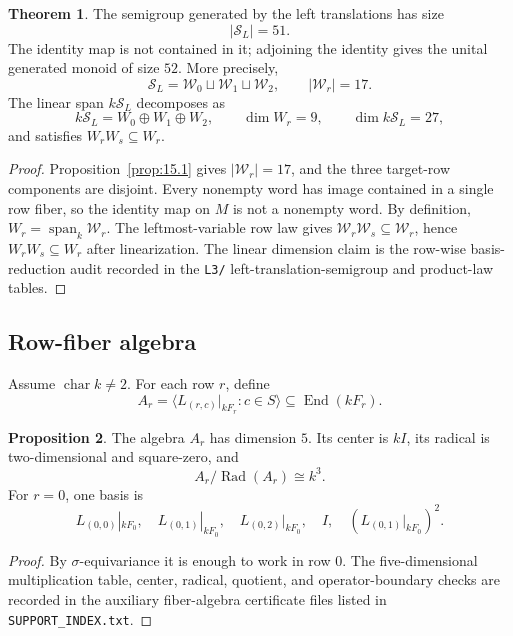 \documentclass[11pt]{article}
\theoremstyle{definition}
\newtheorem{theorem}{Theorem}[section]
\newtheorem{proposition}[theorem]{Proposition}
\begin{document}
\begin{theorem}
\label{thm:15.2}
The semigroup generated by the left translations has size
\[
|\mathcal S_L|=51.
\]
The identity map is not contained in it; adjoining the identity gives the
unital generated monoid of size \(52\).  More precisely,
\[
\mathcal S_L
=
\mathcal W_0\sqcup\mathcal W_1\sqcup\mathcal W_2,
\qquad |\mathcal W_r|=17.
\]
The linear span \(k\mathcal S_L\) decomposes as
\[
k\mathcal S_L=W_0\oplus W_1\oplus W_2,
\qquad
\dim W_r=9,
\qquad
\dim k\mathcal S_L=27,
\]
and satisfies \(W_rW_s\subseteq W_r\).
\end{theorem}

\begin{proof}
Proposition~\ref{prop:15.1} gives \(|\mathcal W_r|=17\), and the three
target-row components are disjoint.  Every nonempty word has image contained in
a single row fiber, so the identity map on \(M\) is not a nonempty word.  By
definition, \(W_r=\operatorname{span}_k\mathcal W_r\).  The
leftmost-variable row law gives
\(\mathcal W_r\mathcal W_s\subseteq\mathcal W_r\), hence
\(W_rW_s\subseteq W_r\) after linearization.  The linear dimension claim is the
row-wise basis-reduction audit recorded in the \texttt{L3/} left-translation-semigroup
and product-law tables.
\end{proof}

\subsection{Row-fiber algebra}\label{row-fiber-algebra}\label{the-five-dimensional-row-fiber-algebra}

Assume \(\operatorname{char}k\ne2\).  For each row \(r\), define
\[
A_r=\langle L_{(r,c)}|_{kF_r}:c\in S\rangle
\subseteq\operatorname{End}(kF_r).
\]

\begin{proposition}
\label{prop:15.3}
The algebra \(A_r\) has dimension \(5\).  Its center is \(kI\), its
radical is two-dimensional and square-zero, and
\[
A_r/\operatorname{Rad}(A_r)\cong k^3.
\]
For \(r=0\), one basis is
\[
L_{(0,0)}|_{kF_0},\quad L_{(0,1)}|_{kF_0},\quad L_{(0,2)}|_{kF_0},
\quad I,\quad (L_{(0,1)}|_{kF_0})^2.
\]
\end{proposition}

\begin{proof}
By \(\sigma\)-equivariance it is enough to work in row \(0\).  The
five-dimensional multiplication table, center, radical, quotient, and
operator-boundary checks are recorded in the auxiliary fiber-algebra
certificate files listed in \texttt{SUPPORT\_INDEX.txt}.
\end{proof}
\end{document}
